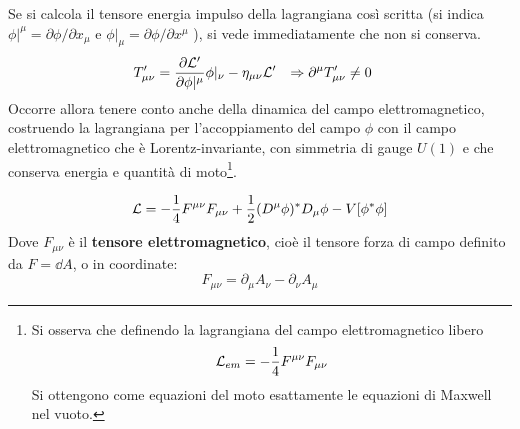 Se si calcola il tensore energia impulso della lagrangiana così scritta (si indica
$\phi| ^{\mu} = \partial \phi / \partial x_\mu$ e
$\phi| _{\mu} = \partial \phi / \partial x^\mu$ ), si vede immediatamente che non si
conserva.
\begin{equation}
   \begin{aligned}
      T'_{\mu\nu} & = \frac{\partial \mathcal{L}'}{\partial \phi|^{\mu}}\phi|_{\nu}
      - \eta _{\mu\nu} \mathcal{L}' &
      \Rightarrow \partial ^\mu T'_{\mu\nu} & \neq 0
   \end{aligned}
\end{equation}
Occorre allora tenere conto anche della dinamica del campo elettromagnetico, costruendo
la lagrangiana per l'accoppiamento del campo $\phi$ con il campo elettromagnetico
che è Lorentz-invariante, con simmetria di gauge $U(1)$ e che conserva energia e
quantità di moto\footnote{
   Si osserva che definendo la lagrangiana del campo elettromagnetico libero
   $$
   \mathcal{L} _{em} = - \frac{1}{4}F^{\mu\nu} F_{\mu\nu}
   $$
   Si ottengono come equazioni del moto esattamente le equazioni di Maxwell nel vuoto.
}.

\begin{equation}
\mathcal{L} = -\frac{1}{4} F^{\mu\nu}F_{\mu\nu}
+ \frac{1}{2} (D^\mu \phi)^* D _\mu \phi - V[\phi^* \phi]
\end{equation}
Dove $F_{\mu\nu}$ è il \textbf{tensore elettromagnetico}, cioè il tensore forza
di campo definito da $F = \dd A$, o in coordinate:
$$
   F_{\mu\nu} = \partial _\mu A _\nu - \partial _\nu A _\mu
$$
